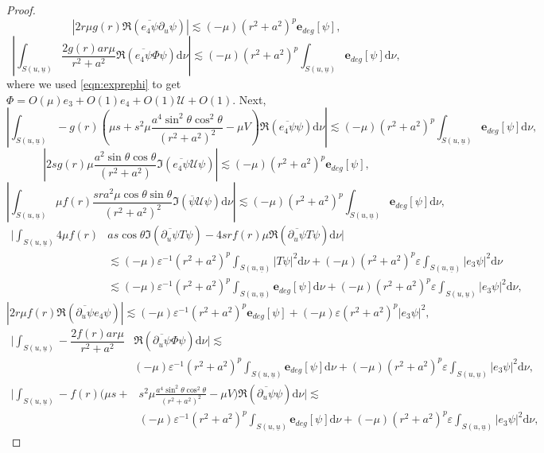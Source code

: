 \documentclass[reqno]{amsart}
\numberwithin{equation}{section}
\newcommand{\intS}{\int_{S(u,\ubar)}}
\newcommand{\ubar}{{\underline{u}}}
\newcommand{\dee}{\mathrm{d}}
\newcommand{\ener}{\mathbf{e}}
\theoremstyle{plain}
\theoremstyle{definition}
\theoremstyle{remark}
\numberwithin{equation}{section}
\begin{document}
\begin{proof}
$$|2r\mu g(r)\mathfrak{R}(\overline{e_4\psi}\partial_u\psi)|\lesssim(-\mu)(r^2+a^2)^p\ener_{deg}[\psi],$$
$$\left|\intS\dfrac{2g(r)ar\mu}{r^2+a^2}\mathfrak{R}(\overline{e_4\psi}\Phi\psi)\dee\nu\right|\lesssim(-\mu)(r^2+a^2)^p\intS\ener_{deg}[\psi]\dee\nu,$$
where we used \eqref{eqn:exprephi} to get $\Phi=O(\mu)e_3+O(1)e_4+O(1)\mathcal{U}+O(1)$. Next, 
$$\left|\intS-g(r)\left(\mu s+s^2\mu\dfrac{a^4\sin^2\theta\cos^2\theta}{(r^2+a^2)^2}-\mu V\right)\mathfrak{R}(\overline{e_4\psi}\psi)\dee\nu\right|\lesssim(-\mu)(r^2+a^2)^p\intS\ener_{deg}[\psi]\dee\nu,$$
$$\left|2sg(r)\mu\dfrac{a^2\sin\theta\cos\theta}{(r^2+a^2)}\mathfrak{I}(\overline{e_4\psi}\mathcal{U}\psi)\right|\lesssim(-\mu)(r^2+a^2)^p\ener_{deg}[\psi],$$
$$\left|\intS\mu f(r)\frac{sra^2\mu\cos\theta\sin\theta}{(r^2+a^2)^2}\mathfrak{I}(\overline{\psi} \mathcal{U}\psi)\dee\nu\right|\lesssim(-\mu)(r^2+a^2)^p\intS\ener_{deg}[\psi]\dee\nu,$$
\begin{align*}
    \Bigg|\intS4\mu f(r)&as\cos\theta\mathfrak{I}(\overline{\partial_u\psi}T\psi)-4srf(r)\mu\mathfrak{R}(\overline{\partial_u\psi}T\psi)\dee\nu\Bigg|\\
    &\lesssim(-\mu)\varepsilon^{-1}(r^2+a^2)^p\intS|T\psi|^2\dee\nu+(-\mu)(r^2+a^2)^p\varepsilon\intS|e_3\psi|^2\dee\nu\\
    &\lesssim(-\mu)\varepsilon^{-1}(r^2+a^2)^p\intS\ener_{deg}[\psi]\dee\nu+(-\mu)(r^2+a^2)^p\varepsilon\intS|e_3\psi|^2\dee\nu,
\end{align*}
$$|2r\mu f(r)\mathfrak{R}(\overline{\partial_u\psi}e_4\psi)|\lesssim(-\mu)\varepsilon^{-1}(r^2+a^2)^p\ener_{deg}[\psi]+(-\mu)\varepsilon (r^2+a^2)^p|e_3\psi|^2,$$
\begin{align*}
    \Bigg|\intS-\dfrac{2f(r)ar\mu}{r^2+a^2}&\mathfrak{R}(\overline{\partial_u\psi}\Phi\psi)\dee\nu\Bigg|\lesssim\\
    &(-\mu)\varepsilon^{-1}(r^2+a^2)^p\intS\ener_{deg}[\psi]\dee\nu+(-\mu)(r^2+a^2)^p\varepsilon\intS|e_3\psi|^2\dee\nu,
\end{align*}
\begin{align*}
    \Bigg|\intS-f(r)\Bigg(\mu s+&s^2\mu\frac{a^4\sin^2\theta\cos^2\theta}{(r^2+a^2)^2}-\mu V\Bigg)\mathfrak{R}(\overline{\partial_u\psi}\psi)\dee\nu\Bigg|\lesssim\\
    &(-\mu)\varepsilon^{-1}(r^2+a^2)^p\intS\ener_{deg}[\psi]\dee\nu+(-\mu)(r^2+a^2)^p\varepsilon\intS|e_3\psi|^2\dee\nu,
\end{align*}


\end{proof}
\end{document}
